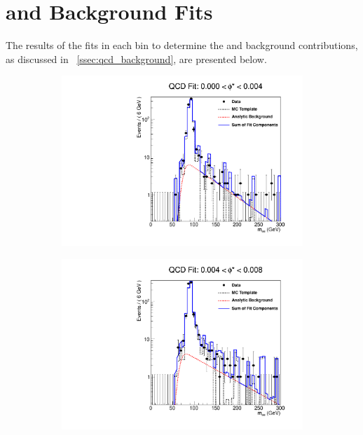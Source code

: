 \chapter{\texorpdfstring{\QCDjets and \wjets}{QCD multi-jet and W+Jets} Background Fits}
\label{app:qcd_fits}

The results of the fits in each \phistar bin to determine the \QCDjets and
\wjets background contributions, as discussed in
\SEC~\ref{ssec:qcd_background}, are presented below.

\begin{figure}[!htbp]
    \centering
    \begin{subfigure}[b]{\SideBySidePlotWidth}
        \includegraphics[width=\linewidth]{figures/qcd_fits/qcd_fit_plot_for_01.pdf}
        \label{fig:qcd_fit_01}
    \end{subfigure}%
    \begin{subfigure}[b]{\SideBySidePlotWidth}
        \includegraphics[width=\linewidth]{figures/qcd_fits/qcd_fit_plot_for_02.pdf}

\end{subfigure}
\end{figure}

